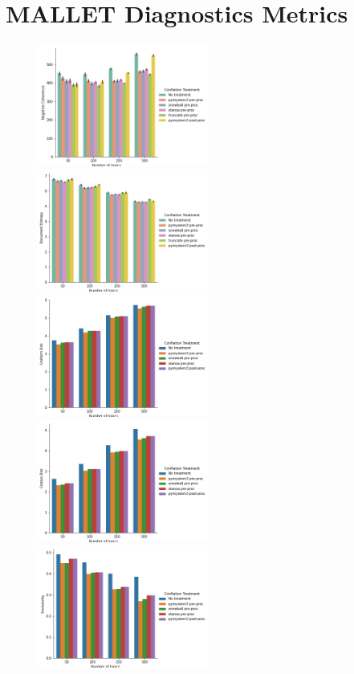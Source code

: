 \documentclass[11pt,a4paper]{article}
\begin{document}
\section{MALLET Diagnostics Metrics}
\begin{figure}[!th]
    \includegraphics[width=0.5\textwidth]{negative_coherence.png}
    \includegraphics[width=0.5\textwidth]{document_entropy.png}
    \includegraphics[width=0.5\textwidth]{uniform_dist.png}
    \includegraphics[width=0.5\textwidth]{corpus_dist.png}
    \includegraphics[width=0.5\textwidth]{exclusivity.png}

\end{figure}
\end{document}
